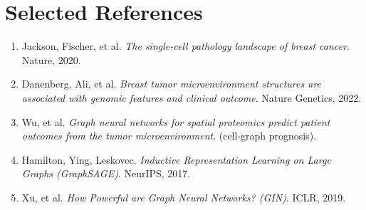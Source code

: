 \documentclass[11pt]{article}
\begin{document}
\section*{Selected References}
\small
\begin{enumerate}[leftmargin=1.4em,itemsep=0pt]
\item Jackson, Fischer, et al. \textit{The single-cell pathology landscape of
breast cancer}. Nature, 2020.
\item Danenberg, Ali, et al. \textit{Breast tumor microenvironment structures
are associated with genomic features and clinical outcome}. Nature Genetics, 2022.
\item Wu, et al. \textit{Graph neural networks for spatial proteomics predict
patient outcomes from the tumor microenvironment}. (cell-graph prognosis).
\item Hamilton, Ying, Leskovec. \textit{Inductive Representation Learning on
Large Graphs (GraphSAGE)}. NeurIPS, 2017.
\item Xu, et al. \textit{How Powerful are Graph Neural Networks? (GIN)}. ICLR, 2019.
\end{enumerate}
\end{document}
